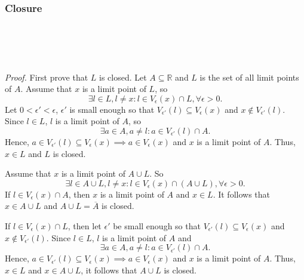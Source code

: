 \documentclass{article}
\begin{document}
            \subsubsection{Closure}
            \\ \\
            \\ \\
            \textit{Proof.} First prove that $L$ is closed. Let $A \subseteq \mathbb{R}$ and $L$ is the set of all limit points of $A$. Assume that $x$ is a limit point of $L$, so
            \begin{equation*}
                \exists l \in L, l \neq x: l \in V_\epsilon(x) \cap L, \forall \epsilon > 0.
            \end{equation*}
            Let $0 < \epsilon' < \epsilon$, $\epsilon'$ is small enough so that $V_{\epsilon'}(l) \subseteq V_\epsilon(x)$ and $x \notin V_{\epsilon'}(l)$. Since $l \in L$, $l$ is a limit point of $A$, so
            \begin{equation*}
                \exists a \in A, a \neq l: a \in V_{\epsilon'}(l) \cap A.
            \end{equation*}
            Hence, $a \in V_{\epsilon'}(l) \subseteq V_\epsilon(x) \implies a \in V_\epsilon(x)$ and $x$ is a limit point of $A$. Thus, $x \in L$ and $L$ is closed.
            
            Assume that $x$ is a limit point of $A \cup L$. So
            \begin{equation*}
                \exists l \in A \cup L, l \neq x: l \in V_\epsilon(x) \cap (A \cup L), \forall \epsilon > 0.
            \end{equation*}
            If $l \in V_\epsilon(x) \cap A$, then $x$ is a limit point of $A$ and $x \in L$. It follows that $x \in A \cup L$ and $A \cup L = \overline{A}$ is closed.
            
            If $l \in V_\epsilon(x) \cap L$, then let $\epsilon'$ be small enough so that $V_{\epsilon'}(l) \subseteq V_\epsilon(x)$ and $x \notin V_{\epsilon'}(l)$. Since $l \in L$, $l$ is a limit point of $A$ and 
            \begin{equation*}
                \exists a \in A, a \neq l: a \in V_{\epsilon'}(l) \cap A.
            \end{equation*}
            Hence, $a \in V_{\epsilon'}(l) \subseteq V_\epsilon(x) \implies a \in V_\epsilon(x)$ and $x$ is a limit point of $A$. Thus, $x \in L$ and $x \in A \cup L$, it follows that $A \cup L$ is closed.
            
\end{document}
